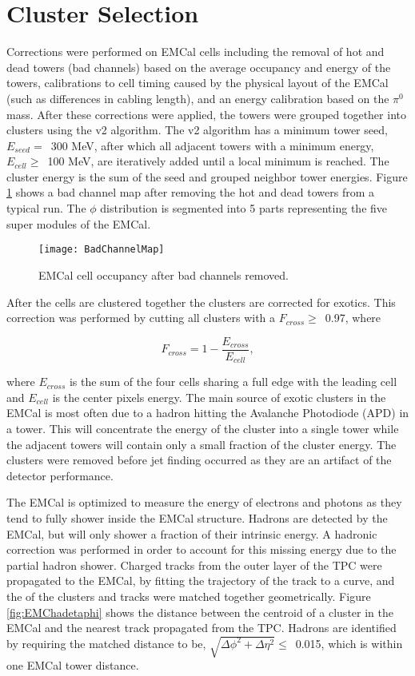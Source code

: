 \section{Cluster Selection}
Corrections were performed on EMCal cells including the removal of hot and dead towers (bad channels) based on the average occupancy and energy of the towers, calibrations to cell timing caused by the physical layout of the EMCal (such as differences in cabling length), and an energy calibration based on the $\pi^{0}$ mass.  After these corrections were applied, the towers were grouped together into clusters using the v2 algorithm.  The v2 algorithm has a minimum tower seed, $E_{seed} = \,$ 300 MeV, after which all adjacent towers with a minimum energy, $E_{cell} \geq \,$ 100 MeV, are iteratively added until a local minimum is reached.  The cluster energy is the sum of the seed and grouped neighbor tower energies.  Figure \ref{fig:badchannel} shows a bad channel map after removing the hot and dead towers from a typical run.  The $\phi$ distribution is segmented into 5 parts representing the five super modules of the EMCal.

\begin{figure}[h]
\texttt{[image: BadChannelMap]}
\centering
\caption{EMCal cell occupancy after bad channels removed.}
\label{fig:badchannel}
\end{figure}

After the cells are clustered together the clusters are corrected for exotics.  This correction was performed by cutting all clusters with a $F_{cross} \geq \,$ 0.97, where

\begin{equation}
F_{cross} = 1 - \frac{ E_{cross} }{ E_{cell} },
\label{eq:Fcross}
\end{equation}

\noindent
where $E_{cross}$ is the sum of the four cells sharing a full edge with the leading cell and $E_{cell}$ is the center pixels energy.  The main source of exotic clusters in the EMCal is most often due to a hadron hitting the Avalanche Photodiode (APD) in a tower.  This will concentrate the energy of the cluster into a single tower while the adjacent towers will contain only a small fraction of the cluster energy.  The clusters were removed before jet finding occurred as they are an artifact of the detector performance.

The EMCal is optimized to measure the energy of electrons and photons as they tend to fully shower inside the EMCal structure.  Hadrons are detected by the EMCal, but will only shower a fraction of their intrinsic energy.  A hadronic correction was performed in order to account for this missing energy due to the partial hadron shower.  Charged tracks from the outer layer of the TPC were propagated to the EMCal, by fitting the trajectory of the track to a curve, and the of the clusters and tracks were matched together geometrically.  Figure \ref{fig:EMChadetaphi} shows the distance between the centroid of a cluster in the EMCal and the nearest track propagated from the TPC.  Hadrons are identified by requiring the matched distance to be, $\sqrt{ \Delta\phi^{2} + \Delta\eta^{2} } \leq \,$ 0.015, which is within one EMCal tower distance.

